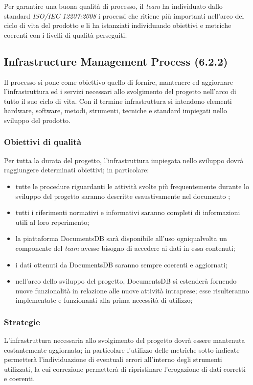 Per garantire una buona qualità di processo, il \textit{team} ha individuato dallo standard \textit{ISO/IEC 12207:2008} i processi che ritiene più importanti nell'arco del ciclo di vita del prodotto e li ha istanziati individuando obiettivi e metriche coerenti con i livelli di qualità perseguiti.
\subsection{Infrastructure Management Process (6.2.2)}
Il processo si pone come obiettivo quello di fornire, mantenere ed aggiornare l'infrastruttura ed i servizi necessari allo svolgimento del progetto nell'arco di tutto il suo ciclo di vita. Con il termine infrastruttura si intendono elementi hardware, software, metodi, strumenti, tecniche e standard impiegati nello sviluppo del prodotto.
\subsubsection{Obiettivi di qualità}
Per tutta la durata del progetto, l'infrastruttura impiegata nello sviluppo dovrà raggiungere determinati obiettivi; in particolare:
\begin{itemize}
\item tutte le procedure riguardanti le attività svolte più frequentemente durante lo sviluppo del progetto saranno descritte esaustivamente nel documento \textit{\NdP};
\item tutti i riferimenti normativi e informativi saranno completi di informazioni utili al loro reperimento;
\item la piattaforma DocumentsDB sarà disponibile all'uso ogniqualvolta un componente del \textit{team} avesse bisogno di accedere ai dati in essa contenuti;
\item i dati ottenuti da DocumentsDB saranno sempre coerenti e aggiornati;
\item nell'arco dello sviluppo del progetto, DocumentsDB si estenderà fornendo nuove funzionalità in relazione alle nuove attività intraprese; esse risulteranno implementate e funzionanti alla prima necessità di utilizzo;
\end{itemize}
\subsubsection{Strategie}
L'infrastruttura necessaria allo svolgimento del progetto dovrà essere mantenuta costantemente aggiornata; in particolare l'utilizzo delle metriche sotto indicate permetterà l'individuazione di eventuali errori all'interno degli strumenti utilizzati, la cui correzione permetterà di ripristinare l'erogazione di dati corretti e coerenti.
